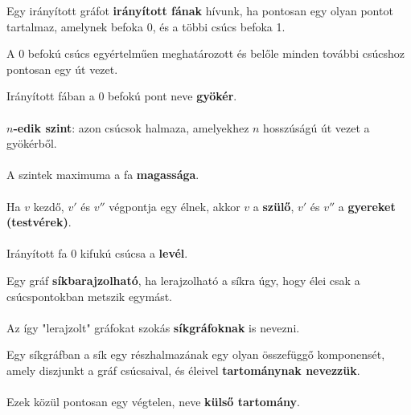 \documentclass{beamer}
\begin{document}
\begin{frame}
\begin{tcolorbox}[title={Def.: Irányított Fa}]
Egy irányított gráfot \textbf{irányított fának} hívunk, ha pontosan egy olyan pontot tartalmaz, amelynek befoka 0, és a többi csúcs befoka 1.
\end{tcolorbox}

\begin{tcolorbox}[title={Ész}]
A 0 befokú csúcs egyértelműen meghatározott és belőle minden további csúcshoz pontosan egy út vezet.
\end{tcolorbox}

\begin{tcolorbox}[squeezed title={Def.: Gyökér, n-edik szint, Magasság, Szülő, Gyerekek, Levél}]
Irányított fában a 0 befokú pont neve \textbf{gyökér}.\\
\\
\textbf{$n$-edik szint}: azon csúcsok halmaza, amelyekhez $n$ hosszúságú út vezet a gyökérből.\\
\\
A szintek maximuma a fa \textbf{magassága}.\\
\\
Ha $v$ kezdő, $v'$ és $v''$ végpontja egy élnek, akkor $v$ a \textbf{szülő}, $v'$ és $v''$ a \textbf{gyereket (testvérek)}.\\
\\
Irányított fa 0 kifukú csúcsa a \textbf{levél}.
\end{tcolorbox}
\end{frame}


\begin{frame}
\begin{tcolorbox}[title={Def.: Síkgráf}]
Egy gráf \textbf{síkbarajzolható}, ha lerajzolható a síkra úgy, hogy élei csak a csúcspontokban metszik egymást.\\
\\
Az így "lerajzolt" gráfokat szokás \textbf{síkgráfoknak} is nevezni.
\end{tcolorbox}

\begin{tcolorbox}[title={Def.: Tartomány}]
Egy síkgráfban a sík egy részhalmazának egy olyan összefüggő komponensét, amely diszjunkt a gráf csúcsaival, és éleivel \textbf{tartománynak nevezzük}.\\
\\
Ezek közül pontosan egy végtelen, neve \textbf{külső tartomány}.
\end{tcolorbox}
\end{frame}
\end{document}
